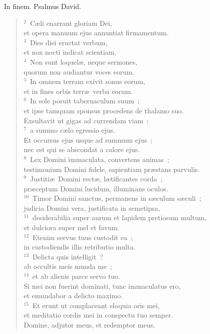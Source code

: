 \bchapter
\lettrine[lines=3,image=true,loversize=0.05,lraise=-0.03]{I}{}n finem. Psalmus David.
\begin{flushleft}\begin{verse}\vspace{6pt}${}^{2}$~C\ae li enarrant gloriam Dei,\\ et opera manuum ejus annuntiat firmamentum.\\
${}^{3}$~Dies diei eructat verbum,\\ et nox nocti indicat scientiam.\\
${}^{4}$~Non sunt loquel\ae , neque sermones,\\ quorum non audiantur voces eorum.\\
${}^{5}$~In omnem terram exivit sonus eorum,\\ et in fines orbis terr\ae\ verba eorum.\\
${}^{6}$~In sole posuit tabernaculum suum~;\\ et ipse tamquam sponsus procedens de thalamo suo.\\ Exsultavit ut gigas ad currendam viam~;\\
${}^{7}$~a summo c\ae lo egressio ejus.\\ Et occursus ejus usque ad summum ejus~;\\ nec est qui se abscondat a calore ejus.\\
${}^{8}$~Lex Domini immaculata, convertens animas~;\\ testimonium Domini fidele, sapientiam pr\ae stans parvulis.\\
${}^{9}$~Justiti\ae\ Domini rect\ae , l\ae tificantes corda~;\\ pr\ae ceptum Domini lucidum, illuminans oculos.\\
${}^{10}$~Timor Domini sanctus, permanens in s\ae culum s\ae culi~;\\ judicia Domini vera, justificata in semetipsa,\\
${}^{11}$~desiderabilia super aurum et lapidem pretiosum multum,\\ et dulciora super mel et favum.\\
${}^{12}$~Etenim servus tuus custodit ea~;\\ in custodiendis illis retributio multa.\\
${}^{13}$~Delicta quis intelligit~?\\ ab occultis meis munda me~;\\
${}^{14}$~et ab alienis parce servo tuo.\\ Si mei non fuerint dominati, tunc immaculatus ero,\\ et emundabor a delicto maximo.\\
${}^{15}$~Et erunt ut complaceant eloquia oris mei,\\ et meditatio cordis mei in conspectu tuo semper.\\ Domine, adjutor meus, et redemptor meus.\end{verse}\end{flushleft}



